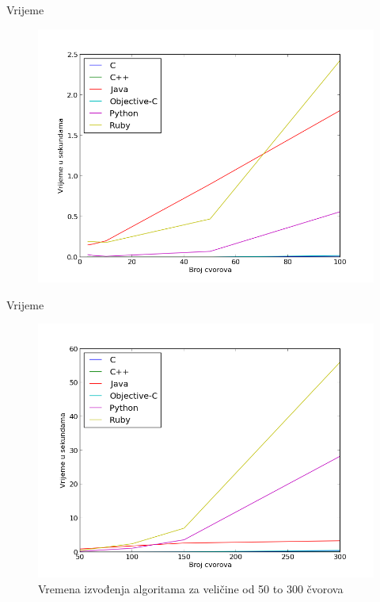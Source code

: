 \documentclass[utf8]{beamer}
\begin{document}
\begin{frame}{Vrijeme}
\begin{figure}
\centering
\includegraphics[scale=0.45]{../Dokumentacija/img/Primjeri_do_100.png}
\end{figure}
\end{frame}

\begin{frame}{Vrijeme}
\begin{figure}
\centering
\includegraphics[scale=0.45]{../Dokumentacija/img/Primjeri_50_300.png}
\caption{Vremena izvođenja algoritama za veličine od 50 to 300 čvorova}
\label{fig:time_50_300}
\end{figure}
\end{frame}
\end{document}
